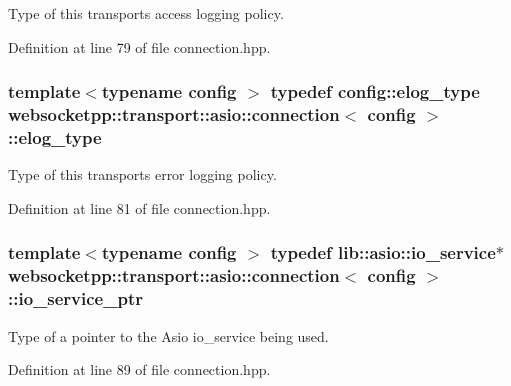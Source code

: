 Type of this transport\textquotesingle{}s access logging policy. 



Definition at line 79 of file connection.\+hpp.

\hypertarget{classwebsocketpp_1_1transport_1_1asio_1_1connection_a1d2ac8c55817ecadf12be51f49578ca5}{}
\subsubsection[{elog\+\_\+type}]{\setlength{\rightskip}{0pt plus 5cm}template$<$typename config $>$ typedef config\+::elog\+\_\+type {\bf websocketpp\+::transport\+::asio\+::connection}$<$ config $>$\+::{\bf elog\+\_\+type}}\label{classwebsocketpp_1_1transport_1_1asio_1_1connection_a1d2ac8c55817ecadf12be51f49578ca5}


Type of this transport\textquotesingle{}s error logging policy. 



Definition at line 81 of file connection.\+hpp.

\hypertarget{classwebsocketpp_1_1transport_1_1asio_1_1connection_a8a0bff59326cab2996e414d32f627232}{}
\subsubsection[{io\+\_\+service\+\_\+ptr}]{\setlength{\rightskip}{0pt plus 5cm}template$<$typename config $>$ typedef lib\+::asio\+::io\+\_\+service$\ast$ {\bf websocketpp\+::transport\+::asio\+::connection}$<$ config $>$\+::{\bf io\+\_\+service\+\_\+ptr}}\label{classwebsocketpp_1_1transport_1_1asio_1_1connection_a8a0bff59326cab2996e414d32f627232}


Type of a pointer to the Asio io\+\_\+service being used. 



Definition at line 89 of file connection.\+hpp.

\hypertarget{classwebsocketpp_1_1transport_1_1asio_1_1connection_aa6f25556860a154c4dacb4dac1dce8e4}{}
